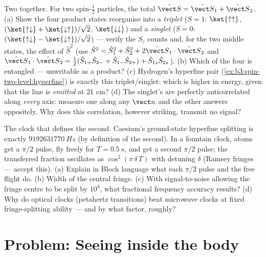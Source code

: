 \begin{exercise}[$\star\star\star$]\label{exo:b3:spin-two-level:11}
Two  together. For two spin-$\tfrac12$ particles, the total
 $\hat{\vect S} = \hat{\vect S}_1 + \hat{\vect S}_2$. (a) Show
the four product states reorganise into a \emph{triplet} ($S = 1$:
$\ket{\uparrow\uparrow}$, $(\ket{\uparrow\downarrow} +
\ket{\downarrow\uparrow})/\sqrt2$, $\ket{\downarrow\downarrow}$)
and a \emph{singlet} ($S = 0$: $(\ket{\uparrow\downarrow} -
\ket{\downarrow\uparrow})/\sqrt2$) --- verify the $S_z$ counts and,
for the two middle states, the effect of $\hat S^2$ (use $\hat
S^2 = \hat S_1^2 + \hat S_2^2 + 2\hat{\vect S}_1\cdot\hat{\vect
S}_2$ and $\hat{\vect S}_1\cdot\hat{\vect S}_2 = \tfrac12(\hat
S_{1+}\hat S_{2-} + \hat S_{1-}\hat S_{2+}) + \hat S_{1z}\hat
S_{2z}$). (b) Which of the four is entangled --- unwritable as a
product? (c) Hydrogen's hyperfine pair
(\cref{ex:b3:spin-two-level:hyperfine}) is exactly this
triplet/singlet: which is higher in energy, given that the line is
\emph{emitted} at 21 cm? (d) The singlet's  are perfectly
anticorrelated along \emph{every} axis: measure one along any
$\vect n$ and the other answers oppositely. Why does this
correlation, however striking, transmit no signal?
\end{exercise}

\begin{exercise}[$\star\star\star$]\label{exo:b3:spin-two-level:12}
The clock that defines the second. Caesium's ground-state hyperfine
splitting is exactly $\qty{9192631770}{Hz}$ (by definition of the
second). In a fountain clock, atoms get a $\pi/2$ pulse, fly freely
for $T = \qty{0.5}{s}$, and get a second $\pi/2$ pulse; the
transferred fraction oscillates as $\cos^2(\pi\,\delta\,T)$ with
detuning $\delta$ (Ramsey fringes --- accept this). (a) Explain in
Bloch language what each $\pi/2$ pulse and the free flight do. (b)
Width of the central fringe. (c) With signal-to-noise allowing the
fringe centre to be split by $10^4$, what fractional frequency
accuracy results? (d) Why do optical clocks (petahertz transitions)
beat microwave clocks at fixed fringe-splitting ability --- and by
what factor, roughly?
\end{exercise}

\section{Problem: Seeing inside the body}

